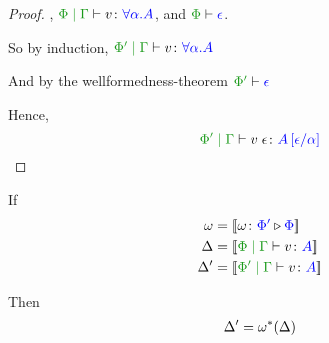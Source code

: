 \documentclass{report}
\begin{document}
\begin{framed}
\begin{proof}
        
            \bi, $\gpetyperelation{v}{\all{\a}{A}}$, and $\wellformed{\P}{\e}$.
        
            So by induction, $\gppetyperelation{v}{\all{\a}{A}}$
        
            And by the wellformedness-theorem $\wellformed{\P'}{\e}$
        
            Hence, \begin{equation}
                \gppetyperelation{\eapp{v}{\e}}{A\ssub{\a}{\e}}
            \end{equation}
        
    \end{proof}
    
    
\end{framed}
\begin{theorem}
    If 
    \begin{align*}
        \w &= \deno{\wrelw{\P'}{\P}}\\
        \D &= \deno{\gpetyperelation{v}{A}}\\
        \D' &= \deno{\etyperelation{\P'}{\G}{v}{A}}\\
    \end{align*}
    
    Then \begin{eqnarray}
        \Delta' = \omega^*(\Delta)
    \end{eqnarray}
\end{theorem}
\end{document}
